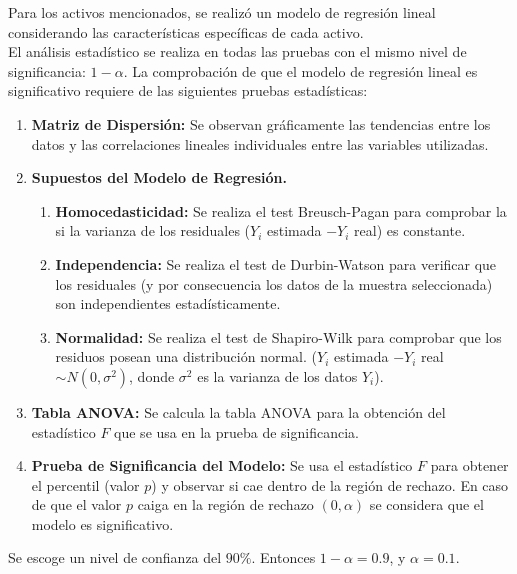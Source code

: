 Para los activos mencionados, se realizó un modelo de regresión lineal considerando 
las características específicas de cada activo. \\ 
El análisis estadístico se realiza en todas las pruebas con el mismo nivel de 
significancia: \(1- \alpha\).
La comprobación de que el modelo de regresión lineal es significativo
requiere de las siguientes pruebas estadísticas:
\begin{enumerate}
	\item \textbf{Matriz de Dispersión:} Se observan gráficamente las tendencias 
		entre los datos y las correlaciones lineales individuales entre las 
		variables utilizadas.
	\item \textbf{Supuestos del Modelo de Regresión.}
		\begin{enumerate}
			\item \textbf{Homocedasticidad:} Se realiza el test Breusch-Pagan para 
				comprobar la si la varianza de los residuales (\(Y_i\) estimada
				\( - Y_i\) real) es constante.
			\item \textbf{Independencia:} Se realiza el test de Durbin-Watson para
				verificar que los residuales (y por consecuencia los datos de la 
				muestra seleccionada) son independientes estadísticamente.
			\item \textbf{Normalidad:} Se realiza el test de Shapiro-Wilk
				para comprobar que los residuos posean una distribución normal.
				(\(Y_i\) estimada \(- Y_i\) real \(\sim N(0, \sigma ^2)\), donde 
				\(\sigma ^ 2\) es la varianza de los datos \(Y_i\)).
		\end{enumerate}
	\item \textbf{Tabla ANOVA:} Se calcula la tabla ANOVA para la obtención del 
		estadístico \(F\) que se usa en la prueba de significancia.
	\item \textbf{Prueba de Significancia del Modelo:} Se usa el estadístico \(F\) 
		para obtener el percentil (valor \(p\))
		y observar si cae dentro de la región de rechazo.
		En caso de que el valor \(p\) caiga en la región de rechazo \((0, \alpha)\)
		se considera que el modelo es significativo.
\end{enumerate}
Se escoge un nivel de confianza del \(90\%\). Entonces \(1- \alpha =0.9\), y 
\(\alpha = 0.1\).

